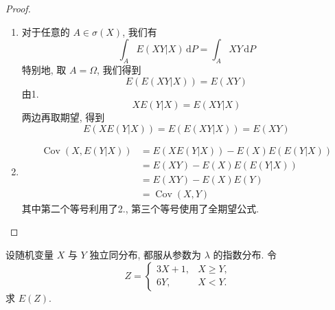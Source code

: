 \documentclass[../main.tex]{subfiles}
\begin{document}
\begin{proof}
\begin{enumerate}
          \item 对于任意的 \(  A\in  \sigma \left( X \right)   \), 我们有 \[
          \int_{A}E\left( XY|X \right)\,\mathrm{d} P=  \int_{A}XY\,\mathrm{d} P 
          \] 特别地, 取 \(  A=  \Omega   \), 我们得到 \[
          E\left( E\left( XY|X \right)  \right)= E\left( XY \right)  
          \] 由1. \[
          XE\left( Y|X \right)= E\left( XY|X \right)  
          \]两边再取期望, 得到 \[
          E\left( XE\left( Y|X \right)  \right)= E\left( E\left( XY|X \right)  \right)= E\left( XY \right)   
          \]
          \item \[
        \begin{aligned}
          \operatorname{Cov}\left( X,E\left( Y|X \right)  \right)&= E\left( XE\left( Y|X \right)  \right)-E\left( X \right)E\left( E\left( Y|X \right) \right)      \\ 
           &= E\left( XY \right)-E\left( X \right)E\left( E\left( Y|X \right)    \right) \\ 
            &= E\left( XY \right)-E\left( X \right)E\left( Y \right)   \\ 
             &= \operatorname{Cov}\left( X,Y \right) 
        \end{aligned}
          \]其中第二个等号利用了2., 第三个等号使用了全期望公式.
     \end{enumerate}
     
\end{proof}

\begin{exercise}{}{}
设随机变量 $X$ 与 $Y$ 独立同分布, 都服从参数为 $\lambda$ 的指数分布. 令
\[
Z = \begin{cases} 3X + 1, & X \geqslant Y, \\ 6Y, & X < Y. \end{cases}
\]
求 $E(Z)$.
\end{exercise}
\end{document}
